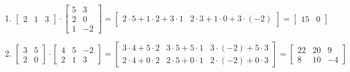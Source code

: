 \begin{examples}\leavevmode
	\begin{enumerate}
		\item {
		      $\begin{bmatrix}
				      2 & 1 & 3
			      \end{bmatrix} \cdot \begin{bmatrix}
				      5 & 3  \\
				      2 & 0  \\
				      1 & -2
			      \end{bmatrix} = \begin{bmatrix}
				      2 \cdot 5 + 1 \cdot 2 + 3 \cdot 1 & 2 \cdot 3 + 1 \cdot 0 + 3 \cdot (-2)
			      \end{bmatrix} = \begin{bmatrix}
				      15 & 0
			      \end{bmatrix}$
		      }

		\item {
		      $\begin{bmatrix}
				      3 & 5 \\
				      2 & 0
			      \end{bmatrix} \cdot  \begin{bmatrix}
				      4 & 5 & -2 \\
				      2 & 1 & 3
			      \end{bmatrix} = \begin{bmatrix}
				      3 \cdot 4 + 5 \cdot 2 & 3 \cdot 5 + 5 \cdot 1 & 3 \cdot (-2) + 5 \cdot 3 \\
				      2 \cdot 4 + 0 \cdot 2 & 2 \cdot 5 + 0 \cdot 1 & 2 \cdot (-2) + 0 \cdot 3
			      \end{bmatrix} = \begin{bmatrix}
				      22 & 20 & 9  \\
				      8  & 10 & -4
			      \end{bmatrix}$
		      }
	\end{enumerate}
\end{examples}

